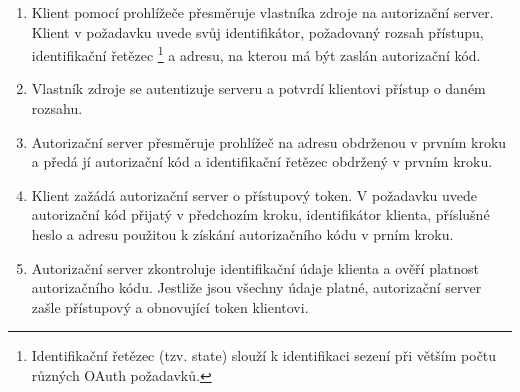 \documentclass[]{fithesis3}
\begin{document}
	\begin{enumerate}
		\item {
		Klient pomocí prohlížeče přesměruje vlastníka zdroje na autorizační server. Klient v 				požadavku uvede svůj identifikátor, požadovaný rozsah přístupu,  identifikační řetězec
			\footnote {
			Identifikační řetězec (tzv. state) slouží k identifikaci sezení při větším počtu různých 				OAuth požadavků.
			}	 
		a adresu, na kterou má být zaslán autorizační kód.
		}
		\item
		Vlastník zdroje se autentizuje serveru a potvrdí klientovi přístup o daném rozsahu.
		\item
		Autorizační server přesměruje prohlížeč na adresu obdrženou v prvním kroku a předá jí 			autorizační kód a identifikační řetězec obdržený v prvním kroku.
		\item
		Klient zažádá autorizační server o přístupový token. V požadavku uvede autorizační kód 			přijatý v předchozím kroku, identifikátor klienta, příslušné heslo a adresu použitou k 				získání autorizačního kódu v prním kroku. 
		\item	
		Autorizační server zkontroluje identifikační údaje klienta a ověří platnost autorizačního 				kódu. Jestliže jsou všechny údaje platné, autorizační server zašle přístupový a obnovující 			token klientovi.

	\end{enumerate}
\end{document}
